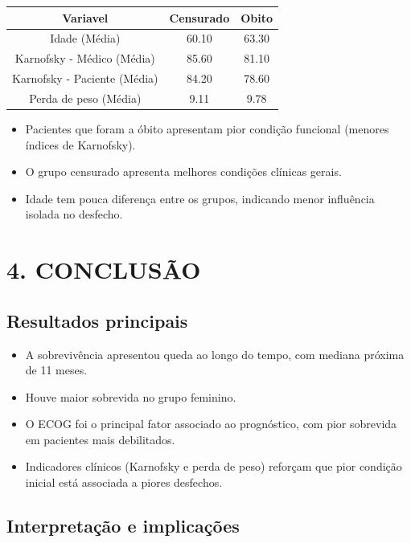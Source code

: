 \documentclass[
  brazilian,
  letterpaper,
  DIV=11,
  numbers=noendperiod]{scrartcl}
\newcounter{none} %
\begin{document}
{\def\LTcaptype{none} %
\begin{longtable}[]{@{}ccc@{}}
\toprule\noalign{}
Variavel & Censurado & Obito \\
\midrule\noalign{}
\endhead
\bottomrule\noalign{}
\endlastfoot
Idade (Média) & 60.10 & 63.30 \\
Karnofsky - Médico (Média) & 85.60 & 81.10 \\
Karnofsky - Paciente (Média) & 84.20 & 78.60 \\
Perda de peso (Média) & 9.11 & 9.78 \\
\end{longtable}
}

\begin{itemize}
\item
  Pacientes que foram a óbito apresentam pior condição funcional
  (menores índices de Karnofsky).
\item
  O grupo censurado apresenta melhores condições clínicas gerais.
\item
  Idade tem pouca diferença entre os grupos, indicando menor influência
  isolada no desfecho.
\end{itemize}

\section{\texorpdfstring{\textbf{4.
CONCLUSÃO}}{4. CONCLUSÃO}}\label{conclusuxe3o-2}

\subsection{\texorpdfstring{\textbf{Resultados
principais}}{Resultados principais}}\label{resultados-principais}

\begin{itemize}
\item
  A sobrevivência apresentou queda ao longo do tempo, com mediana
  próxima de 11 meses.
\item
  Houve maior sobrevida no grupo feminino.
\item
  O ECOG foi o principal fator associado ao prognóstico, com pior
  sobrevida em pacientes mais debilitados.
\item
  Indicadores clínicos (Karnofsky e perda de peso) reforçam que pior
  condição inicial está associada a piores desfechos.
\end{itemize}

\subsection{\texorpdfstring{\textbf{Interpretação e
implicações}}{Interpretação e implicações}}\label{interpretauxe7uxe3o-e-implicauxe7uxf5es}
\end{document}
